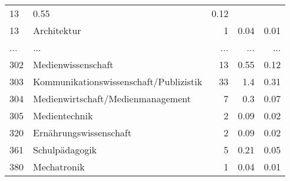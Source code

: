 \begin{longtable}{lXrrr}
          \num{13} &
          \num[round-mode=places,round-precision=2]{0,55} &
          \num[round-mode=places,round-precision=2]{0,12} \\
        13 & \multicolumn{1}{X}{Architektur} & %
          \num{1} &
          \num[round-mode=places,round-precision=2]{0,04} &
          \num[round-mode=places,round-precision=2]{0,01} \\
       ... & ... & ... & ... & ... \\
        302 & \multicolumn{1}{X}{Medienwissenschaft} & %
          \num{13} &
          \num[round-mode=places,round-precision=2]{0,55} &
          \num[round-mode=places,round-precision=2]{0,12} \\

        303 & \multicolumn{1}{X}{Kommunikationswissenschaft/Publizistik} & %
          \num{33} &
          \num[round-mode=places,round-precision=2]{1,4} &
          \num[round-mode=places,round-precision=2]{0,31} \\

        304 & \multicolumn{1}{X}{Medienwirtschaft/Medienmanagement} & %
          \num{7} &
          \num[round-mode=places,round-precision=2]{0,3} &
          \num[round-mode=places,round-precision=2]{0,07} \\

        305 & \multicolumn{1}{X}{Medientechnik} & %
          \num{2} &
          \num[round-mode=places,round-precision=2]{0,09} &
          \num[round-mode=places,round-precision=2]{0,02} \\

        320 & \multicolumn{1}{X}{Ernährungswissenschaft} & %
          \num{2} &
          \num[round-mode=places,round-precision=2]{0,09} &
          \num[round-mode=places,round-precision=2]{0,02} \\

        361 & \multicolumn{1}{X}{Schulpädagogik} & %
          \num{5} &
          \num[round-mode=places,round-precision=2]{0,21} &
          \num[round-mode=places,round-precision=2]{0,05} \\

        380 & \multicolumn{1}{X}{Mechatronik} & %
          \num{1} &
          \num[round-mode=places,round-precision=2]{0,04} &
          \num[round-mode=places,round-precision=2]{0,01} \\


\end{longtable}

